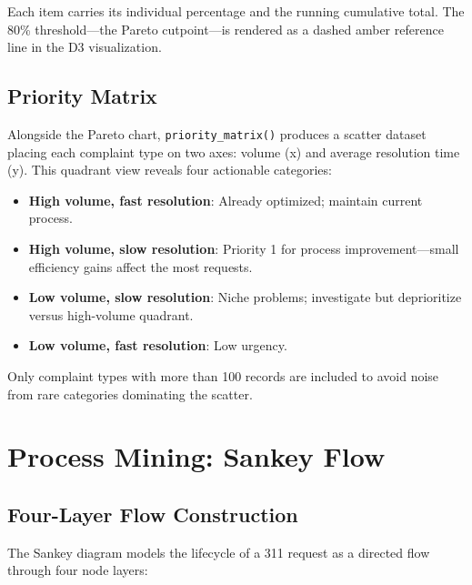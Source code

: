 Each item carries its individual percentage and the running cumulative total. The 80\% threshold---the Pareto cutpoint---is rendered as a dashed amber reference line in the D3 visualization.

\subsection{Priority Matrix}

Alongside the Pareto chart, \texttt{priority\_matrix()} produces a scatter dataset placing each complaint type on two axes: volume (x) and average resolution time (y). This quadrant view reveals four actionable categories:

\begin{itemize}
  \item \textbf{High volume, fast resolution}: Already optimized; maintain current process.
  \item \textbf{High volume, slow resolution}: Priority 1 for process improvement---small efficiency gains affect the most requests.
  \item \textbf{Low volume, slow resolution}: Niche problems; investigate but deprioritize versus high-volume quadrant.
  \item \textbf{Low volume, fast resolution}: Low urgency.
\end{itemize}

Only complaint types with more than 100 records are included to avoid noise from rare categories dominating the scatter.

\section{Process Mining: Sankey Flow}
\label{sec:ops-sankey}


\subsection{Four-Layer Flow Construction}

The Sankey diagram models the lifecycle of a 311 request as a directed flow through four node layers:

